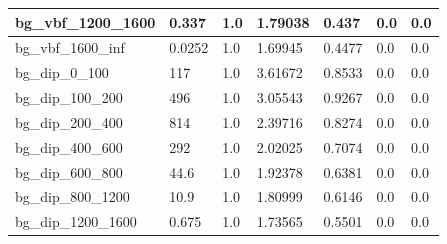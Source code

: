 \documentclass[a4paper, 10pt]{article}
\begin{document}
\begin{table}[H]
\begin{center}
\begin{tabular}{|m{23.0mm}|m{23.0mm}|m{18.0mm}|m{19.0mm}|m{19.0mm}|m{19.0mm}|m{19.0mm}|}
      \hline
      {\cellcolor{white}         bg\_vbf\_1200\_1600}& {\cellcolor{white}         0.337}& {\cellcolor{white}         1.0}& {\cellcolor{white}         1.79038}& {\cellcolor{white}         0.437}& {\cellcolor{green}         0.0}& {\cellcolor{green}         0.0}\\
      \hline
      {\cellcolor{white}         bg\_vbf\_1600\_inf}& {\cellcolor{white}         0.0252}& {\cellcolor{white}         1.0}& {\cellcolor{white}         1.69945}& {\cellcolor{white}         0.4477}& {\cellcolor{green}         0.0}& {\cellcolor{green}         0.0}\\
      \hline
      {\cellcolor{white}         bg\_dip\_0\_100}& {\cellcolor{white}         117}& {\cellcolor{white}         1.0}& {\cellcolor{white}         3.61672}& {\cellcolor{white}         0.8533}& {\cellcolor{green}         0.0}& {\cellcolor{green}         0.0}\\
      \hline
      {\cellcolor{white}         bg\_dip\_100\_200}& {\cellcolor{white}         496}& {\cellcolor{white}         1.0}& {\cellcolor{white}         3.05543}& {\cellcolor{white}         0.9267}& {\cellcolor{green}         0.0}& {\cellcolor{green}         0.0}\\
      \hline
      {\cellcolor{white}         bg\_dip\_200\_400}& {\cellcolor{white}         814}& {\cellcolor{white}         1.0}& {\cellcolor{white}         2.39716}& {\cellcolor{white}         0.8274}& {\cellcolor{green}         0.0}& {\cellcolor{green}         0.0}\\
      \hline
      {\cellcolor{white}         bg\_dip\_400\_600}& {\cellcolor{white}         292}& {\cellcolor{white}         1.0}& {\cellcolor{white}         2.02025}& {\cellcolor{white}         0.7074}& {\cellcolor{green}         0.0}& {\cellcolor{green}         0.0}\\
      \hline
      {\cellcolor{white}         bg\_dip\_600\_800}& {\cellcolor{white}         44.6}& {\cellcolor{white}         1.0}& {\cellcolor{white}         1.92378}& {\cellcolor{white}         0.6381}& {\cellcolor{green}         0.0}& {\cellcolor{green}         0.0}\\
      \hline
      {\cellcolor{white}         bg\_dip\_800\_1200}& {\cellcolor{white}         10.9}& {\cellcolor{white}         1.0}& {\cellcolor{white}         1.80999}& {\cellcolor{white}         0.6146}& {\cellcolor{green}         0.0}& {\cellcolor{green}         0.0}\\
      \hline
      {\cellcolor{white}         bg\_dip\_1200\_1600}& {\cellcolor{white}         0.675}& {\cellcolor{white}         1.0}& {\cellcolor{white}         1.73565}& {\cellcolor{white}         0.5501}& {\cellcolor{green}         0.0}& {\cellcolor{green}         0.0}\\

\end{tabular}
\end{center}
\end{table}
\end{document}
